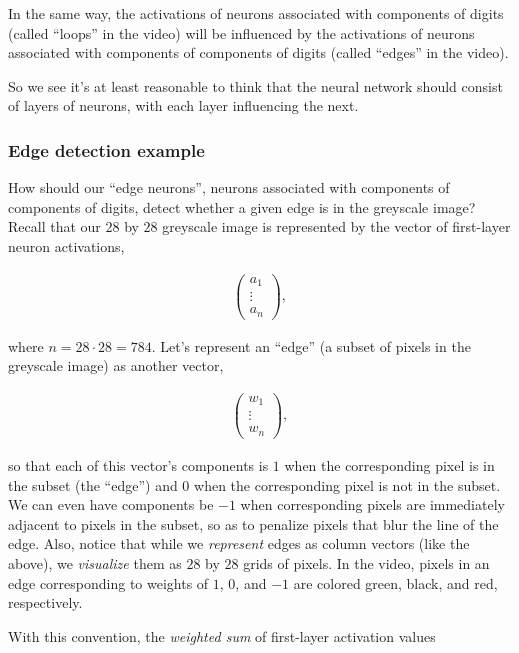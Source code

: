 \documentclass{article}
\begin{document}
	In the same way, the activations of neurons associated with components of digits (called ``loops'' in the video) will be influenced by the activations of neurons associated with components of components of digits (called ``edges'' in the video).
	
	So we see it's at least reasonable to think that the neural network should consist of layers of neurons, with each layer influencing the next.
	
	\subsubsection*{Edge detection example}
	
	How should our ``edge neurons'', neurons associated with components of components of digits, detect whether a given edge is in the greyscale image? Recall that our $28$ by $28$ greyscale image is represented by the vector of first-layer neuron activations,
	
	\begin{align*}
		\begin{pmatrix}
			a_1 \\
			\vdots \\
			a_n
		\end{pmatrix},
	\end{align*}
	
	where $n = 28 \cdot 28 = 784$. Let's represent an ``edge'' (a subset of pixels in the greyscale image) as another vector,
	
	\begin{align*}
		\begin{pmatrix}
			w_1 \\
			\vdots \\
			w_n
		\end{pmatrix},
	\end{align*}
	
	so that each of this vector's components is $1$ when the corresponding pixel is in the subset (the ``edge'') and $0$ when the corresponding pixel is not in the subset. We can even have components be $-1$ when corresponding pixels are immediately adjacent to pixels in the subset, so as to penalize pixels that blur the line of the edge. Also, notice that while we \textit{represent} edges as column vectors (like the above), we \textit{visualize} them as $28$ by $28$ grids of pixels. In the video, pixels in an edge corresponding to weights of $1$, $0$, and $-1$ are colored green, black, and red, respectively.
	
	With this convention, the \textit{weighted sum} of first-layer activation values 
	
\end{document}
